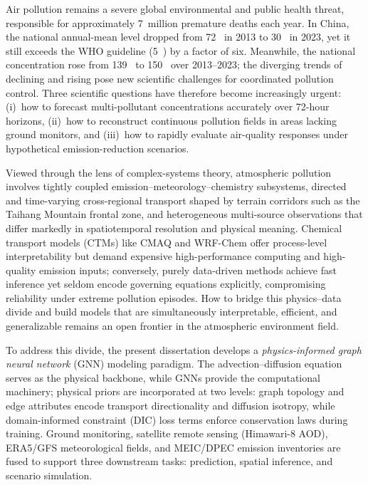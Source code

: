 \begin{abstract*}

Air pollution remains a severe global environmental and public health threat, responsible for approximately 7~million premature deaths each year. In China, the national annual-mean \PM{} level dropped from 72~\ug{} in 2013 to 30~\ug{} in 2023, yet it still exceeds the WHO guideline (5~\ug{}) by a factor of six. Meanwhile, the national \ozone{} concentration rose from 139~\ug{} to 150~\ug{} over 2013--2023; the diverging trends of declining \PM{} and rising \ozone{} pose new scientific challenges for coordinated pollution control. Three scientific questions have therefore become increasingly urgent: (i)~how to forecast multi-pollutant concentrations accurately over 72-hour horizons, (ii)~how to reconstruct continuous pollution fields in areas lacking ground monitors, and (iii)~how to rapidly evaluate air-quality responses under hypothetical emission-reduction scenarios.

Viewed through the lens of complex-systems theory, atmospheric pollution involves tightly coupled emission--meteorology--chemistry subsystems, directed and time-varying cross-regional transport shaped by terrain corridors such as the Taihang Mountain frontal zone, and heterogeneous multi-source observations that differ markedly in spatiotemporal resolution and physical meaning. Chemical transport models (CTMs) like CMAQ and WRF-Chem offer process-level interpretability but demand expensive high-performance computing and high-quality emission inputs; conversely, purely data-driven methods achieve fast inference yet seldom encode governing equations explicitly, compromising reliability under extreme pollution episodes. How to bridge this physics--data divide and build models that are simultaneously interpretable, efficient, and generalizable remains an open frontier in the atmospheric environment field.

To address this divide, the present dissertation develops a \emph{physics-informed graph neural network} (GNN) modeling paradigm. The advection--diffusion equation serves as the physical backbone, while GNNs provide the computational machinery; physical priors are incorporated at two levels: graph topology and edge attributes encode transport directionality and diffusion isotropy, while domain-informed constraint (DIC) loss terms enforce conservation laws during training. Ground monitoring, satellite remote sensing (Himawari-8 AOD), ERA5/GFS meteorological fields, and MEIC/DPEC emission inventories are fused to support three downstream tasks: prediction, spatial inference, and scenario simulation.


\end{abstract*}
